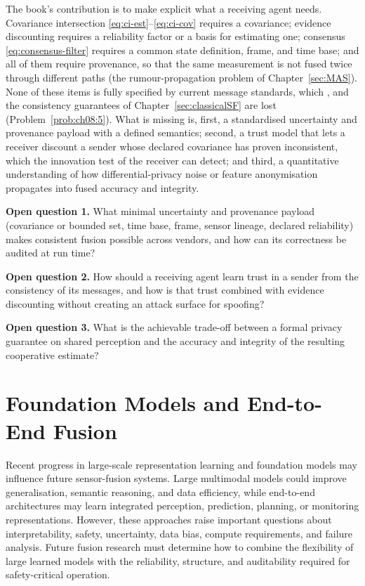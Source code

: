 The book's contribution is to make explicit what a receiving agent needs. Covariance intersection \eqref{eq:ci-est}--\eqref{eq:ci-cov} requires a covariance; evidence discounting requires a reliability factor or a basis for estimating one; consensus \eqref{eq:consensus-filter} requires a common state definition, frame, and time base; and all of them require provenance, so that the same measurement is not fused twice through different paths (the rumour-propagation problem of Chapter~\ref{sec:MAS}). None of these items is fully specified by current message standards, which , and the consistency guarantees of Chapter~\ref{sec:classicalSF} are lost (Problem~\ref{prob:ch08:5}). What is missing is, first, a standardised uncertainty and provenance payload with a defined semantics; second, a trust model that lets a receiver discount a sender whose declared covariance has proven inconsistent, which the innovation test of the receiver can detect; and third, a quantitative understanding of how differential-privacy noise or feature anonymisation propagates into fused accuracy and integrity.

\begin{list4a}
    \item \textbf{Open question 1.} What minimal uncertainty and provenance payload (covariance or bounded set, time base, frame, sensor lineage, declared reliability) makes consistent fusion possible across vendors, and how can its correctness be audited at run time?
    \item \textbf{Open question 2.} How should a receiving agent learn trust in a sender from the consistency of its messages, and how is that trust combined with evidence discounting without creating an attack surface for spoofing?
    \item \textbf{Open question 3.} What is the achievable trade-off between a formal privacy guarantee on shared perception and the accuracy and integrity of the resulting cooperative estimate?
\end{list4a}

\section{Foundation Models and End-to-End Fusion}
\label{subsec:oc-foundation}
%
Recent progress in large-scale representation learning and foundation models may influence future sensor-fusion systems. Large multimodal models could improve generalisation, semantic reasoning, and data efficiency, while end-to-end architectures may learn integrated perception, prediction, planning, or monitoring representations. However, these approaches raise important questions about interpretability, safety, uncertainty, data bias, compute requirements, and failure analysis. Future fusion research must determine how to combine the flexibility of large learned models with the reliability, structure, and auditability required for safety-critical operation.

